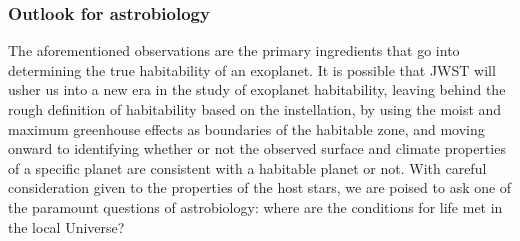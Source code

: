 \subsubsection{Outlook for astrobiology}

The aforementioned observations are the primary ingredients that go into determining the true habitability of an exoplanet. It is possible that JWST will usher us into a new era in the study of exoplanet habitability, leaving behind the rough definition of habitability based on the instellation, by using the moist and maximum greenhouse effects as boundaries of the habitable zone, and moving onward to identifying whether or not the observed surface and climate properties of a specific planet are consistent with a habitable planet or not. With careful consideration given to the properties of the host stars, we are poised to ask one of the paramount questions of astrobiology: where are the conditions for life met in the local Universe?
